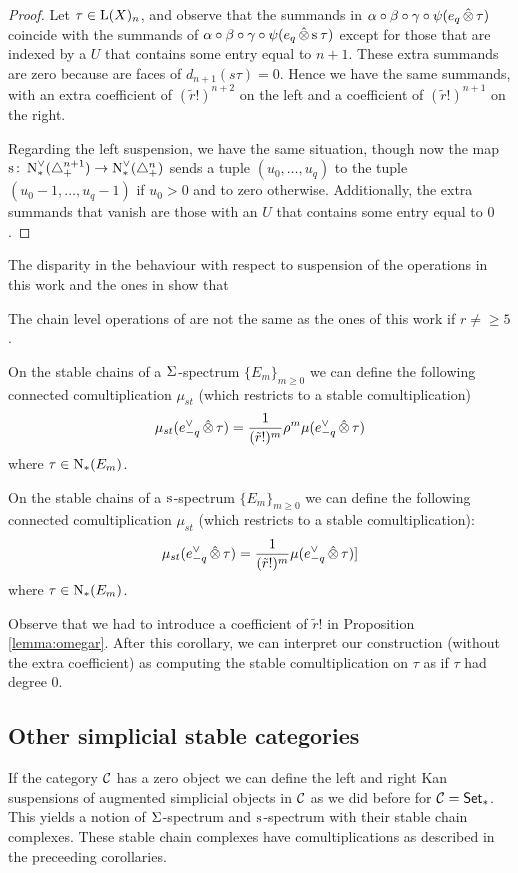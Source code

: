 \begin{proof}
    Let $\tau\in \operatorname{L}(X)_n$, and observe that the summands in $\alpha\circ\beta\circ\gamma\circ \psi(e_q\operatorname{\hat{\otimes}} \tau)$ coincide with the summands of $\alpha\circ\beta\circ\gamma\circ \psi(e_q\operatorname{\hat{\otimes}} \operatorname{s}^{}\tau)$ except for those that are indexed by a $U$ that contains some entry equal to $n+1$. These extra summands are zero because are faces of $d_{n+1}(s{} \tau) = 0$. Hence we have the same summands, with an extra coefficient of $(\tilde{r}!)^{n+2}$ on the left and a coefficient of $(\tilde{r}!)^{n+1}$ on the right.

    Regarding the left suspension, we have the same situation, though now the map $\operatorname{s}^{} \colon  \operatorname{N}^\vee_{*}(\triangle_{+}^{n+1})\to \operatorname{N}^\vee_{*}(\triangle_{+}^{n})$ sends a tuple $(u_0,\ldots,u_q)$ to the tuple $(u_0-1,\ldots,u_q-1)$ if $u_0>0$ and to zero otherwise. Additionally, the extra summands that vanish are those with an $U$ that contains some entry equal to $0$.
\end{proof}
The disparity in the behaviour with respect to suspension of the operations in this work and the ones in \cite{medina2021may_st} show that
\begin{corollary}
	The chain level operations of \cite{medina2021may_st} are not the same as the ones of this work if $r\neq \geq 5$.
\end{corollary}

\begin{corollary}
    On the stable chains of a $\Sigma^{}$-spectrum $\{E_m\}_{m\geq 0}$ we can define the following connected comultiplication $\mu_{st}$ (which restricts to a stable comultiplication)
    \[
        \mu_{st}(e_{-q}^\vee\operatorname{\hat{\otimes}} \tau) = \frac{1}{(\tilde{r}!)^{m}}\rho^m \mu(e_{-q}^\vee\operatorname{\hat{\otimes}} \tau)
    \]
    where $\tau\in \operatorname{N}_{*}(E_m)$.
\end{corollary}

\begin{corollary}
    On the stable chains of a $\operatorname{s}^{}$-spectrum $\{E_m\}_{m\geq 0}$ we can define the following connected comultiplication $\mu_{st}$ (which restricts to a stable comultiplication):
    \[
        \mu_{st}(e_{-q}^\vee\operatorname{\hat{\otimes}} \tau) = \frac{1}{(\tilde{r}!)^m}\mu(e_{-q}^\vee\operatorname{\hat{\otimes}} \tau)]
    \]
    where $\tau\in\operatorname{N}_{*}(E_m)$.
\end{corollary}
Observe that we had to introduce a coefficient of $\tilde{r}!$ in Proposition \ref{lemma:omegar}. After this corollary, we can interpret our construction (without the extra coefficient) as computing the stable comultiplication on $\tau$ as if $\tau$ had degree $0$.

\subsection{Other simplicial stable categories}

If the category $\mathcal{C}$ has a zero object we can define the left and right Kan suspensions of augmented simplicial objects in $\mathcal{C}$ as we did before for $\mathcal{C} = \mathsf{Set}_*$. This yields a notion of $\Sigma^{}$-spectrum and $\operatorname{s}^{}$-spectrum with their stable chain complexes. These stable chain complexes have comultiplications as described in the preceeding corollaries.
